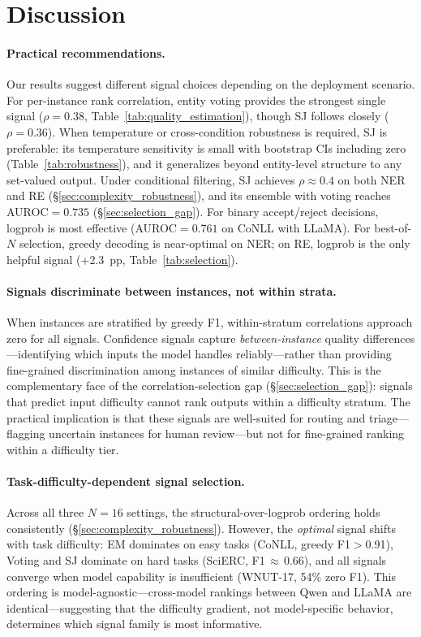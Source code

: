 \section{Discussion}\label{sec:discussion}

\paragraph{Practical recommendations.}
Our results suggest different signal choices depending on the deployment scenario.
For per-instance rank correlation, entity voting provides the strongest single signal ($\rho{=}0.38$, Table~\ref{tab:quality_estimation}), though SJ follows closely ($\rho{=}0.36$).
When temperature or cross-condition robustness is required, SJ is preferable: its temperature sensitivity is small with bootstrap CIs including zero (Table~\ref{tab:robustness}), and it generalizes beyond entity-level structure to any set-valued output.
Under conditional filtering, SJ achieves $\rho{\approx}0.4$ on both NER and RE (\S\ref{sec:complexity_robustness}), and its ensemble with voting reaches AUROC${=}0.735$ (\S\ref{sec:selection_gap}).
For binary accept/reject decisions, logprob is most effective (AUROC${=}0.761$ on CoNLL with LLaMA).
For best-of-$N$ selection, greedy decoding is near-optimal on NER; on RE, logprob is the only helpful signal (+2.3~pp, Table~\ref{tab:selection}).

\paragraph{Signals discriminate between instances, not within strata.}
When instances are stratified by greedy F1, within-stratum correlations approach zero for all signals.
Confidence signals capture \textit{between-instance} quality differences---identifying which inputs the model handles reliably---rather than providing fine-grained discrimination among instances of similar difficulty.
This is the complementary face of the correlation-selection gap (\S\ref{sec:selection_gap}): signals that predict input difficulty cannot rank outputs within a difficulty stratum.
The practical implication is that these signals are well-suited for routing and triage---flagging uncertain instances for human review---but not for fine-grained ranking within a difficulty tier.

\paragraph{Task-difficulty-dependent signal selection.}
Across all three $N{=}16$ settings, the structural-over-logprob ordering holds consistently (\S\ref{sec:complexity_robustness}).
However, the \textit{optimal} signal shifts with task difficulty: EM dominates on easy tasks (CoNLL, greedy F1${>}$0.91), Voting and SJ dominate on hard tasks (SciERC, F1$\,{\approx}\,$0.66), and all signals converge when model capability is insufficient (WNUT-17, 54\% zero F1).
This ordering is model-agnostic---cross-model rankings between Qwen and LLaMA are identical---suggesting that the difficulty gradient, not model-specific behavior, determines which signal family is most informative.

